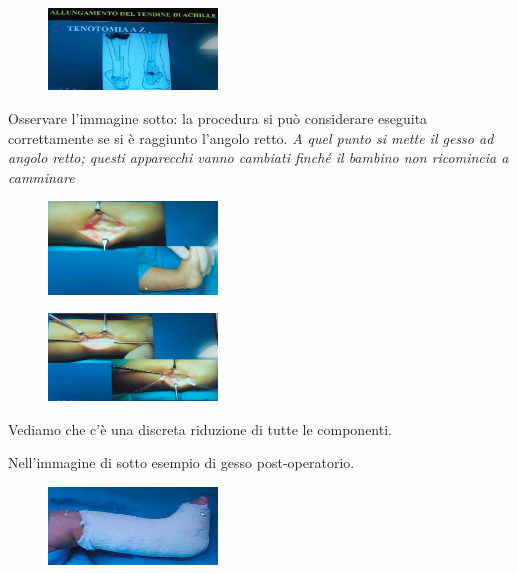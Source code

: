 \begin{itemize}
\begin{itemize}
\begin{itemize}
\begin{figure}[!ht]
\centering
\includegraphics[width=0.4\textwidth]{016/image19.png}
\end{figure}

Osservare l'immagine sotto: la procedura si può considerare eseguita correttamente se si è raggiunto l'angolo retto. \emph{A quel punto si mette il gesso ad angolo retto; questi apparecchi vanno cambiati finché
il bambino non ricomincia a camminare}

\begin{figure}[!ht]
\centering
\includegraphics[width=0.4\textwidth]{016/image20.png}
\end{figure}

\begin{figure}[!ht]
\centering
\includegraphics[width=0.4\textwidth]{016/image21.png}
\end{figure}

Vediamo che c'è una discreta riduzione di tutte le componenti.

Nell'immagine di sotto esempio di gesso post-operatorio.

\begin{figure}[!ht]
\centering
\includegraphics[width=0.4\textwidth]{016/image22.png}
\end{figure}


\end{itemize}
\end{itemize}
\end{itemize}
